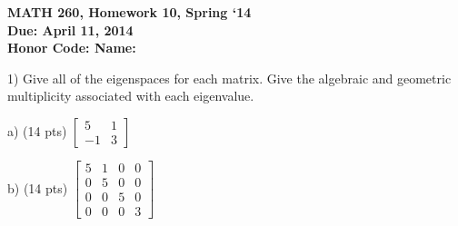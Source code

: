 \documentclass{article}
\begin{document}
\begin{flushleft}
	\bfseries{MATH 260, Homework 10, Spring `14}\\
	\bfseries{Due: April 11, 2014}\\
	\bfseries{Honor Code:} \hspace{3.5in}\bfseries{Name:}\\
\end{flushleft}
\begin{flushleft}
\vspace{.25in}

1) Give all of the eigenspaces for each matrix.  Give the algebraic and geometric multiplicity associated with each eigenvalue.

\vspace{0.2in}

a) (14 pts) $\begin{bmatrix} 5&1\\-1&3 \end{bmatrix}$

\pagebreak

b) (14 pts) $\begin{bmatrix} 5&1&0&0\\0&5&0&0\\0&0&5&0\\0&0&0&3 \end{bmatrix}$

\end{flushleft}
\end{document}
